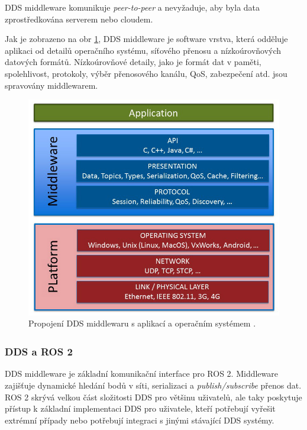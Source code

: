 \acs{DDS} middleware komunikuje \textit{peer-to-peer} a nevyžaduje, aby byla data zprostředkována serverem nebo cloudem. 

Jak je zobrazeno na obr \ref{fig:DDSmiddleware}, \acs{DDS} middleware je software vrstva, která odděluje aplikaci od detailů operačního systému, síťového přenosu a nízkoúrovňových datových formátů. Nízkoúrovňové detaily, jako je formát dat v paměti, spolehlivost, protokoly, výběr přenosového kanálu, \acs{QoS}, zabezpečení atd. jsou spravovány middlewarem. 

\begin{figure}[!ht]
    \begin{center}
        \includegraphics[scale=0.4]{obrazky/DDS1}
    \end{center}
    \caption[Propojení \acs{DDS} middlewaru s aplikací a operačním systémem]{Propojení \acs{DDS} middlewaru s aplikací a operačním systémem \cite{DDS_Main}.}
    \label{fig:DDSmiddleware}
\end{figure}

\subsubsection{DDS\texorpdfstring{\textsuperscript{\textregistered}}{ (R)} a ROS 2}

\acs{DDS} middleware je základní komunikační interface pro ROS 2. Middleware zajišťuje dynamické hledání bodů v síti, serializaci a \textit{publish/subscribe} přenos dat. ROS 2 skrývá velkou část složitosti \acs{DDS} pro většinu uživatelů, ale taky poskytuje přístup k základní implementaci \acs{DDS} pro uživatele, kteří potřebují vyřešit extrémní případy nebo potřebují integraci s jinými stávající \acs{DDS} systémy. \cite{ROS2DDS}

